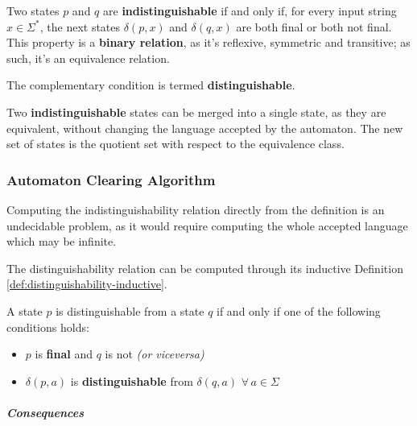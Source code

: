 \documentclass[english]{article}
\begin{document}
\begin{definition}
  \label{def:indistinguishable-states}
  Two states \(p\) and \(q\) are \textbf{indistinguishable} if and only if, for every input string \(x \in \Sigma^\ast\), the next states \(\delta(p, x)\) and \(\delta(q, x)\) are both final or both not final.
  This property is a \textbf{binary relation}, as it's reflexive, symmetric and transitive; as such, it's an equivalence relation.

  The complementary condition is termed \textbf{distinguishable}.
\end{definition}

Two \textbf{indistinguishable} states can be merged into a single state, as they are equivalent, without changing the language accepted by the automaton.
The new set of states is the quotient set with respect to the equivalence class.

\subsubsection{Automaton Clearing Algorithm}

Computing the indistinguishability relation directly from the definition is an undecidable problem, as it would require computing the whole accepted language which may be infinite.

The distinguishability relation can be computed through its inductive Definition \ref{def:distinguishability-inductive}.

\begin{definition}
  \label{def:distinguishability-inductive}
  A state \(p\) is distinguishable from a state \(q\) if and only if one of the following conditions holds:

  \begin{itemize}
    \item \(p\) is \textbf{final} and \(q\) is not \textit{(or viceversa)}
    \item \(\delta(p, a)\) is \textbf{distinguishable} from \(\delta(q, a)\) \(\forall \, a \in \Sigma\)
  \end{itemize}
\end{definition}

\subparagraph*{Consequences}
\end{document}
